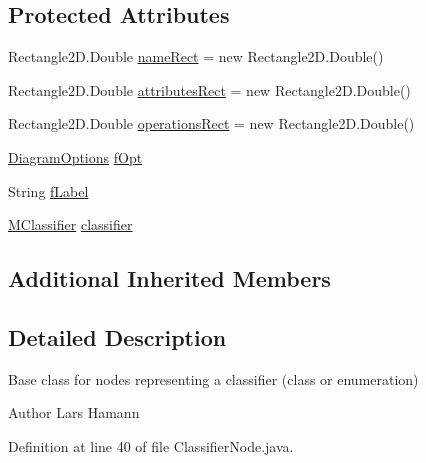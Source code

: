 \subsection*{Protected Attributes}
\begin{DoxyCompactItemize}
\item 
Rectangle2\-D.\-Double \hyperlink{classorg_1_1tzi_1_1use_1_1gui_1_1views_1_1diagrams_1_1classdiagram_1_1_classifier_node_a8c89742792d99f95b2432b4a96f70566}{name\-Rect} = new Rectangle2\-D.\-Double()
\item 
Rectangle2\-D.\-Double \hyperlink{classorg_1_1tzi_1_1use_1_1gui_1_1views_1_1diagrams_1_1classdiagram_1_1_classifier_node_aef249a085a21f3925798b06dedb38344}{attributes\-Rect} = new Rectangle2\-D.\-Double()
\item 
Rectangle2\-D.\-Double \hyperlink{classorg_1_1tzi_1_1use_1_1gui_1_1views_1_1diagrams_1_1classdiagram_1_1_classifier_node_a5f0ee530b78fa45045ebda6d4cb897cb}{operations\-Rect} = new Rectangle2\-D.\-Double()
\item 
\hyperlink{classorg_1_1tzi_1_1use_1_1gui_1_1views_1_1diagrams_1_1_diagram_options}{Diagram\-Options} \hyperlink{classorg_1_1tzi_1_1use_1_1gui_1_1views_1_1diagrams_1_1classdiagram_1_1_classifier_node_afd86c9b87f9eec12e5a257792eda8ce2}{f\-Opt}
\item 
String \hyperlink{classorg_1_1tzi_1_1use_1_1gui_1_1views_1_1diagrams_1_1classdiagram_1_1_classifier_node_a772785b0051ef0a4e0fa1e51c566132d}{f\-Label}
\item 
\hyperlink{interfaceorg_1_1tzi_1_1use_1_1uml_1_1mm_1_1_m_classifier}{M\-Classifier} \hyperlink{classorg_1_1tzi_1_1use_1_1gui_1_1views_1_1diagrams_1_1classdiagram_1_1_classifier_node_ab75ed8a05577c6cc4f7362aad41e4a0c}{classifier}
\end{DoxyCompactItemize}
\subsection*{Additional Inherited Members}


\subsection{Detailed Description}
Base class for nodes representing a classifier (class or enumeration)

\begin{DoxyAuthor}{Author}
Lars Hamann 
\end{DoxyAuthor}


Definition at line 40 of file Classifier\-Node.\-java.



